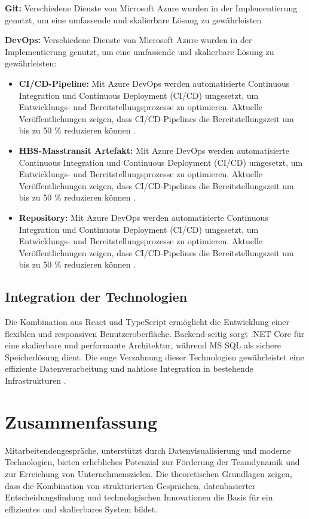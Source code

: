 \begin{itemize}
\begin{itemize}
\end{itemize}

\item \textbf{Git:} Verschiedene Dienste von Microsoft Azure wurden in der Implementierung genutzt, um eine umfassende und skalierbare Lösung zu gewährleisten
\item \textbf{DevOps:} Verschiedene Dienste von Microsoft Azure wurden in der Implementierung genutzt, um eine umfassende und skalierbare Lösung zu gewährleisten:
    \begin{itemize}    
    \item \textbf{CI/CD-Pipeline:} Mit Azure DevOps werden automatisierte Continuous Integration und Continuous Deployment (CI/CD) umgesetzt, um Entwicklungs- und Bereitstellungsprozesse zu optimieren. Aktuelle Veröffentlichungen zeigen, dass CI/CD-Pipelines die Bereitstellungszeit um bis zu 50 \% reduzieren können \cite{azureDevOps, fowler2020continuous}.
     \item \textbf{HBS-Masstransit Artefakt:} Mit Azure DevOps werden automatisierte Continuous Integration und Continuous Deployment (CI/CD) umgesetzt, um Entwicklungs- und Bereitstellungsprozesse zu optimieren. Aktuelle Veröffentlichungen zeigen, dass CI/CD-Pipelines die Bereitstellungszeit um bis zu 50 \% reduzieren können \cite{azureDevOps, fowler2020continuous}.

      \item \textbf{Repository:} Mit Azure DevOps werden automatisierte Continuous Integration und Continuous Deployment (CI/CD) umgesetzt, um Entwicklungs- und Bereitstellungsprozesse zu optimieren. Aktuelle Veröffentlichungen zeigen, dass CI/CD-Pipelines die Bereitstellungszeit um bis zu 50 \% reduzieren können \cite{azureDevOps, fowler2020continuous}.
\end{itemize}


\subsection*{Integration der Technologien}
Die Kombination aus React und TypeScript ermöglicht die Entwicklung einer flexiblen und responsiven Benutzeroberfläche. Backend-seitig sorgt .NET Core für eine skalierbare und performante Architektur, während MS SQL als sichere Speicherlösung dient. Die enge Verzahnung dieser Technologien gewährleistet eine effiziente Datenverarbeitung und nahtlose Integration in bestehende Infrastrukturen \cite{microsoftAzure}.

\section{Zusammenfassung}
Mitarbeitendengespräche, unterstützt durch Datenvisualisierung und moderne Technologien, bieten erhebliches Potenzial zur Förderung der Teamdynamik und zur Erreichung von Unternehmenszielen. Die theoretischen Grundlagen zeigen, dass die Kombination von strukturierten Gesprächen, datenbasierter Entscheidungsfindung und technologischen Innovationen die Basis für ein effizientes und skalierbares System bildet.

